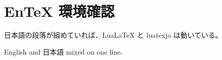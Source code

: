 \documentclass{ltjsarticle}
\begin{document}
\section{EnTeX 環境確認}
日本語の段落が組めていれば、LuaLaTeX と luatexja は動いている。

English and 日本語 mixed on one line.
\end{document}
